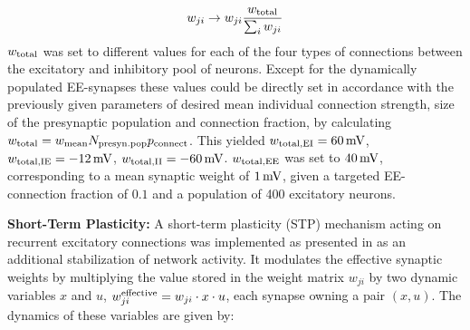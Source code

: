\documentclass[10pt,a4paper]{article}
\begin{document}
\begin{equation}
w_{ji} \rightarrow w_{ji} \frac{w_{\rm total}}{\sum_i w_{ji}}
\label{Synnnorm}
\end{equation}
$w_{\rm total}$ was set to different values for each of the four types of connections between the excitatory and inhibitory pool of neurons. Except for the dynamically populated EE-synapses these values could be directly set in accordance with the previously given parameters of desired mean individual connection strength, size of the presynaptic population and connection fraction, by calculating $w_{\rm total} = w_{\rm mean} N_{\rm presyn. pop} p_{\rm connect}$. This yielded $w_{\rm total,EI} = \rm 60\, mV$, $w_{\rm total,IE} =\rm -12\, mV$, $w_{\rm total,II} =\rm -60\, mV$. $w_{\rm total,EE}$ was set to $\rm 40\, mV$,  corresponding to a mean synaptic weight of $\rm 1\, mV$, given a targeted EE-connection fraction of $0.1$ and a population of 400 excitatory neurons.

\textbf{Short-Term Plasticity:} A short-term plasticity (STP) mechanism acting on recurrent excitatory connections was implemented as presented in \cite{Markram_STP} as an additional stabilization of network activity. It modulates the effective synaptic weights by multiplying the value stored in the weight matrix $w_{ji}$ by two dynamic variables $x$ and $u$, $w^{\rm effective}_{ji} = w_{ji}\cdot x \cdot u$, each synapse owning a pair $(x,u)$. The dynamics of these variables are given by:
\end{document}
